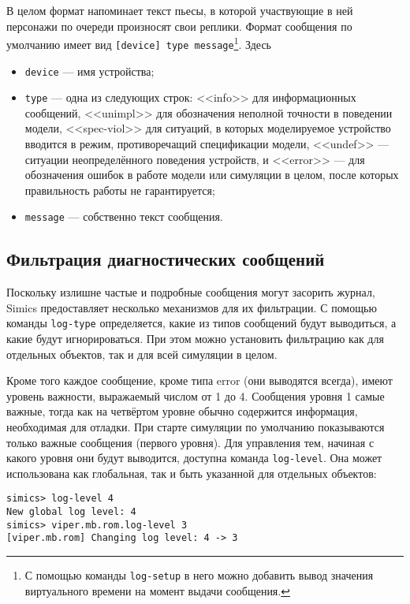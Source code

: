 В целом формат напоминает текст пьесы, в которой участвующие в ней персонажи по очереди произносят свои реплики.
Формат сообщения по умолчанию имеет вид \texttt{[device] type message}\footnote{С помощью команды \texttt{log-setup} в него можно добавить вывод значения виртуального времени на момент выдачи сообщения.}. Здесь
\begin{itemize}
    \item \texttt{device} --- имя устройства;
    \item \texttt{type} --- одна из следующих строк: <<info>> для информационных сообщений, <<unimpl>> для обозначения неполной точности в поведении модели, <<spec-viol>> для ситуаций, в которых моделируемое устройство вводится в режим, противоречащий спецификации модели, <<undef>> --- ситуации неопределённого поведения устройств, и <<error>> --- для обозначения ошибок в работе модели или симуляции в целом, после которых правильность работы не гарантируется;
    \item \texttt{message} --- собственно текст сообщения.
\end{itemize}

\subsection{Фильтрация диагностических сообщений}
Поскольку излишне частые и подробные сообщения могут засорить журнал, Simics предоставляет несколько механизмов для их фильтрации. С помощью команды \texttt{log-type} определяется, какие из типов сообщений будут выводиться, а какие будут игнорироваться. При этом можно установить фильтрацию как для отдельных объектов, так и для всей симуляции в целом.

Кроме того каждое сообщение, кроме типа error (они выводятся всегда), имеют уровень важности, выражаемый числом от 1 до 4. Сообщения уровня 1 самые важные, тогда как на четвёртом уровне обычно содержится информация, необходимая для отладки. При старте симуляции по умолчанию показываются только важные сообщения (первого уровня). Для управления тем, начиная с какого уровня они будут выводится, доступна команда \texttt{log-level}. Она может использована как глобальная, так и быть указанной для отдельных объектов:

\begin{lstlisting}
simics> log-level 4
New global log level: 4
simics> viper.mb.rom.log-level 3
[viper.mb.rom] Changing log level: 4 -> 3
\end{lstlisting}

